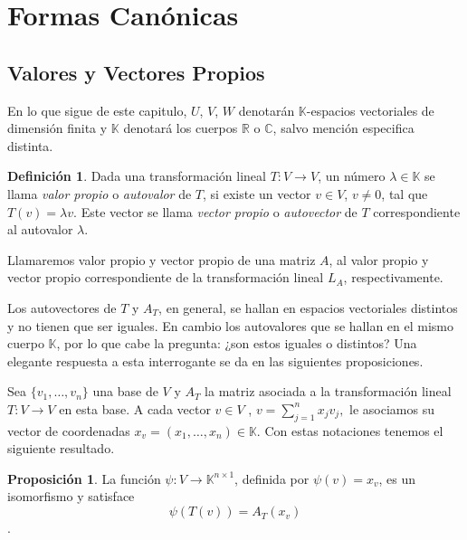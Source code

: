 \documentclass[10pt,a4paper]{article}
\theoremstyle{definition}
\newtheorem{definition}{Definición}[section]
\newtheorem{proposition}{Proposición}[section]
\begin{document}
\pagecolor{black}
\color{white}
\section{Formas Canónicas}

\subsection{Valores y Vectores Propios}

En lo que sigue de este capitulo, $U$, $V$, $W$ denotarán $\mathbb{K}$-espacios vectoriales de dimensión finita y $\mathbb{K}$ denotará los cuerpos $\mathbb{R}$ o $\mathbb{C}$, salvo mención especifica distinta.

\begin{definition}
Dada una transformación lineal $T\colon V \rightarrow{V}$, un número $\lambda\in\mathbb{K}$ se llama \emph{valor propio} o \emph{autovalor} de $T$, si existe un vector $v\in V$, $v\neq0$, tal que $T(v)=\lambda v$. Este vector se llama \emph{vector propio} o \emph{autovector} de $T$ correspondiente al autovalor $\lambda$.

Llamaremos valor propio y vector propio de una matriz $A$, al valor propio y vector propio correspondiente de la transformación lineal $L_{A}$, respectivamente.
\end{definition}

Los autovectores de $T$ y $A_{T}$, en general, se hallan en espacios vectoriales distintos y no tienen que ser iguales. En cambio los autovalores que se hallan en el mismo cuerpo $\mathbb{K}$, por lo que cabe la pregunta: ¿son estos iguales o distintos? Una elegante respuesta a esta interrogante se da en las siguientes proposiciones.

Sea $\{v_1,\ldots,v_n\}$ una base de $V$ y $A_{T}$ la matriz asociada a la transformación lineal $T\colon V \rightarrow{V}$ en esta base. A cada vector $v\in V$ , $v = \sum\limits_{j=1}^{n}x_{j}v_{j},$ le asociamos su vector de coordenadas $x_v=(x_1,\ldots,x_n)\in\mathbb{K}$. Con estas notaciones tenemos el siguiente resultado.

\begin{proposition}
La función $\psi\colon V\rightarrow\mathbb{K}^{n\times 1}$, definida por $\psi(v)= x_v$, es un isomorfismo y satisface \[ \psi(T(v))=A_{T}(x_v) \].    
\end{proposition}
\end{document}
